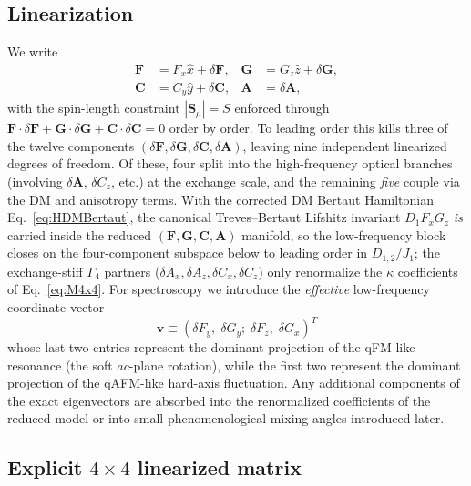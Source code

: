\documentclass[reprint,amsmath,amssymb,aps,prb,longbibliography]{revtex4-2}
\newcommand{\fix}[1]{#1}
\newcommand{\bfS}{\mathbf{S}}
\newcommand{\bfF}{\mathbf{F}}
\newcommand{\bfG}{\mathbf{G}}
\newcommand{\bfA}{\mathbf{A}}
\newcommand{\bfC}{\mathbf{C}}
\begin{document}
\subsection{Linearization}
We write
\begin{equation}
\begin{aligned}
\bfF &= F_x\hat x + \delta\bfF, & \bfG &= G_z\hat z + \delta\bfG,\\
\bfC &= C_y\hat y + \delta\bfC, & \bfA &= \delta\bfA,
\end{aligned}
\label{eq:linearizationFe}
\end{equation}
with the spin-length constraint $|\bfS_\mu|=S$ enforced through
$\bfF\cdot\delta\bfF + \bfG\cdot\delta\bfG + \bfC\cdot\delta\bfC = 0$
order by order. To leading order this kills three of the twelve
components $(\delta\bfF,\delta\bfG,\delta\bfC,\delta\bfA)$, leaving
nine independent linearized degrees of freedom. Of these, four split
into the high-frequency optical branches (involving $\delta\bfA$,
$\delta C_z$, etc.) at the exchange scale, and the remaining
\emph{five} couple via the DM and anisotropy terms.
\fix{With the corrected DM Bertaut Hamiltonian Eq.~\eqref{eq:HDMBertaut},
the canonical Treves--Bertaut Lifshitz invariant $D_1 F_xG_z$ \emph{is}
carried inside the reduced $(\bfF,\bfG,\bfC,\bfA)$ manifold, so the
low-frequency block closes on the four-component subspace below to
leading order in $D_{1,2}/J_1$; the exchange-stiff $\Gamma_4$ partners
($\delta A_x,\delta A_z,\delta C_x,\delta C_z$) only renormalize the
$\kappa$ coefficients of Eq.~\eqref{eq:M4x4}.} For spectroscopy we
introduce the \emph{effective} low-frequency coordinate vector
\begin{equation}
\mathbf v \equiv (\delta F_y,\;\delta G_y;\;\delta F_z,\;\delta G_x)^T
\label{eq:lowfreqsubspace}
\end{equation}
whose last two entries represent the dominant projection of the qFM-like
resonance (the soft $ac$-plane rotation), while the first two represent
the dominant projection of the qAFM-like hard-axis fluctuation. Any
additional components of the exact eigenvectors are absorbed into the
renormalized coefficients of the reduced model or into small
phenomenological mixing angles introduced later.

\subsection{Explicit \texorpdfstring{$4\times 4$}{4x4} linearized matrix}
\label{sec:M4x4}
\end{document}
